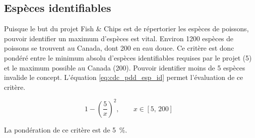 

\subsection{Espèces identifiables}
\label{s:cdc_pdd_esp_id}

Puisque le but du projet Fish \& Chips est de répertorier les espèces de poissons, pouvoir identifier un maximum d’espèces est vital. Environ 1200 espèces de poissons se trouvent au Canada, dont 200 en eau douce. Ce critère est donc pondéré entre le minimum absolu d’espèces identifiables requises par le projet (5) et le maximum possible au Canada (200).\cite{nelson_2015} Pouvoir identifier moins de 5 espèces invalide le concept. L’équation \ref{eq:cdc_pdd_esp_id} permet l’évaluation de ce critère. 

\begin{equation} \label{eq:cdc_pdd_esp_id}
1 - \left( \frac{5}{x}\right)^2, \qquad x \in [5,\,200]
\end{equation}

La pondération de ce critère est de 5~\%.
